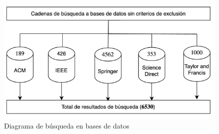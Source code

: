 \begin{figure}[H]
    \centering
    \includegraphics[scale=0.9]{tablas-images/cp2/bases-sin-criterio.png}
    \caption{Diagrama de búsqueda en bases de datos}\label{fig:tabla-resumen-busqueda}
\end{figure}